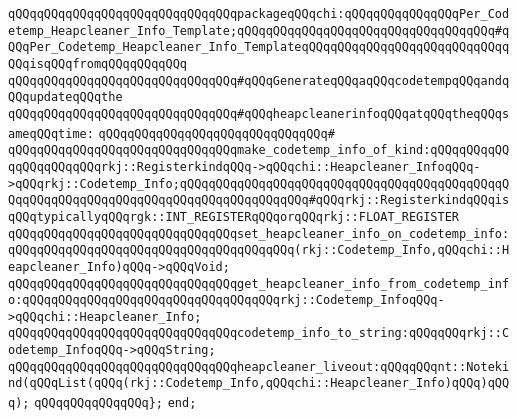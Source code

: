 \verb|qQQqqQQqqQQqqQQqqQQqqQQqqQQqqQQqpackageqQQqchi:qQQqqQQqqQQqqQQqPer_Codetemp_Heapcleaner_Info_Template;qQQqqQQqqQQqqQQqqQQqqQQqqQQqqQQqqQQq#qQQqPer_Codetemp_Heapcleaner_Info_TemplateqQQqqQQqqQQqqQQqqQQqqQQqqQQqqQQqisqQQqfromqQQqqQQqqQQq|\newline
\newline
\verb|qQQqqQQqqQQqqQQqqQQqqQQqqQQqqQQq#qQQqGenerateqQQqaqQQqcodetempqQQqandqQQqupdateqQQqthe|\newline
\verb|qQQqqQQqqQQqqQQqqQQqqQQqqQQqqQQq#qQQqheapcleanerinfoqQQqatqQQqtheqQQqsameqQQqtime:|\newline
\verb|qQQqqQQqqQQqqQQqqQQqqQQqqQQqqQQq#|\newline
\verb|qQQqqQQqqQQqqQQqqQQqqQQqqQQqqQQqmake_codetemp_info_of_kind:qQQqqQQqqQQqqQQqqQQqqQQqrkj::RegisterkindqQQq->qQQqchi::Heapcleaner_InfoqQQq->qQQqrkj::Codetemp_Info;qQQqqQQqqQQqqQQqqQQqqQQqqQQqqQQqqQQqqQQqqQQqqQQqqQQqqQQqqQQqqQQqqQQqqQQqqQQqqQQqqQQqqQQq#qQQqrkj::RegisterkindqQQqisqQQqtypicallyqQQqrgk::INT_REGISTERqQQqorqQQqrkj::FLOAT_REGISTER|\newline
\newline
\verb|qQQqqQQqqQQqqQQqqQQqqQQqqQQqqQQqset_heapcleaner_info_on_codetemp_info:qQQqqQQqqQQqqQQqqQQqqQQqqQQqqQQqqQQqqQQq(rkj::Codetemp_Info,qQQqchi::Heapcleaner_Info)qQQq->qQQqVoid;|\newline
\verb|qQQqqQQqqQQqqQQqqQQqqQQqqQQqqQQqget_heapcleaner_info_from_codetemp_info:qQQqqQQqqQQqqQQqqQQqqQQqqQQqqQQqqQQqrkj::Codetemp_InfoqQQq->qQQqchi::Heapcleaner_Info;|\newline
\newline
\verb|qQQqqQQqqQQqqQQqqQQqqQQqqQQqqQQqcodetemp_info_to_string:qQQqqQQqrkj::Codetemp_InfoqQQq->qQQqString;|\newline
\newline
\verb|qQQqqQQqqQQqqQQqqQQqqQQqqQQqqQQqheapcleaner_liveout:qQQqqQQqnt::Notekind(qQQqList(qQQq(rkj::Codetemp_Info,qQQqchi::Heapcleaner_Info)qQQq)qQQq);|\newline
\verb|qQQqqQQqqQQqqQQq};|\newline
\verb|end;|\newline

